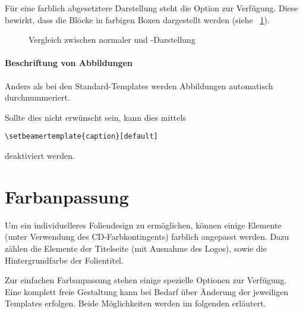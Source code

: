 \begin{Declaration}
\end{Declaration}

Für eine farblich abgesetztere Darstellung steht die Option 
zur Verfügung. Diese bewirkt, dass die Blöcke in farbigen Boxen dargestellt werden
(siehe \figurename~\ref{subfig:colorblocks}).


\begin{figure}[!ht]
\begin{minipage}{0.5\textwidth}
  \centering
  \label{subfig:stdblocks}
\end{minipage}
\begin{minipage}{0.5\textwidth}
  \centering
  \label{subfig:colorblocks}
\end{minipage}
\caption{Vergleich zwischen normaler und -Darstellung}
\end{figure}


\paragraph{Beschriftung von Abbildungen}

Anders als bei den Standard-Templates werden Abbildungen
automatisch durchnummeriert.

Sollte dies nicht erwünscht sein, kann dies mittels
\begin{lstlisting}
\setbeamertemplate{caption}[default]
\end{lstlisting}
deaktiviert werden.

\section{Farbanpassung}\label{beamer:sec:color}

Um ein individuelleres Foliendesign zu ermöglichen, können einige Elemente
(unter Verwendung des CD-Farbkontingents)
farblich angepasst werden.
Dazu zählen die Elemente der Titelseite (mit Ausnahme des Logos),
sowie die Hintergrundfarbe der Folientitel.

Zur einfachen Farbanpassung stehen einige spezielle Optionen zur Verfügung.
Eine komplett freie Gestaltung kann bei Bedarf über Änderung der
jeweiligen Templates erfolgen. Beide Möglichkeiten werden im folgenden
erläutert.


